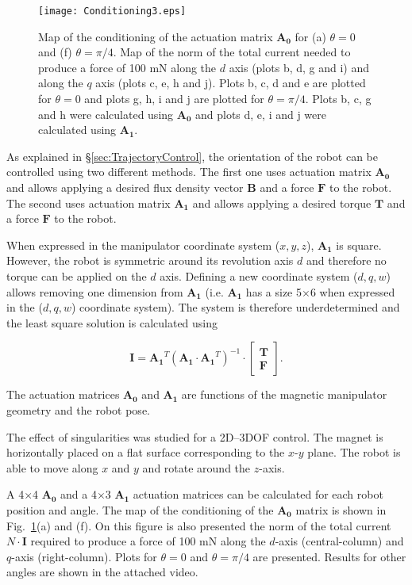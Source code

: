 \begin{figure}
	\texttt{[image: Conditioning3.eps]}
	\caption{Map of the conditioning of the actuation matrix $\mathbf{A_0}$ for (a) $\theta=0$ and (f) $\theta=\pi/4$. 
	Map of the norm of the total current needed to produce a force of 100 mN along the $d$ axis (plots b, d, g and i) and along the $q$ axis (plots c, e, h and j). 
	Plots b, c, d and e are plotted for $\theta=0$ and plots g, h, i and j are plotted for $\theta=\pi/4$.
	Plots b, c, g and h were calculated using $\mathbf{A_0}$ and plots d, e, i and j were calculated using $\mathbf{A_1}$. }
	\label{condition}
\end{figure}


As explained in \S\ref{sec:TrajectoryControl}, the orientation of the robot can be controlled using two different methods. 
 The first one uses actuation matrix $\mathbf{A_0}$ and allows applying a desired flux density vector $\mathbf{B}$ and a force $\mathbf{F}$ to the robot. 
 The second uses actuation matrix $\mathbf{A_1}$ and allows applying a desired torque $\mathbf{T}$ and a force $\mathbf{F}$ to the robot.

When expressed in the manipulator coordinate system ($x,y,z$), $\mathbf{A_1}$ is square. However, the robot is symmetric around its revolution axis $d$ and therefore no torque can be applied on the $d$ axis. Defining a new coordinate system ($d,q,w$) allows removing one dimension from $\mathbf{A_1}$ (i.e. $\mathbf{A_1}$ has a size 5$\times$6 when expressed in the ($d,q,w$) coordinate system). The system is therefore underdetermined and the least square solution is calculated using 
 
\begin{equation}
\label{LS}
\mathbf{I}=\mathbf{A_1}^{T}\left ( \mathbf{A_1} \cdot \mathbf{A_1}^{T} \right )^{-1}\cdot \begin{bmatrix}
\mathbf{T}
\\ 
\mathbf{F}
\end{bmatrix}.
\end{equation}

The actuation matrices $\mathbf{A_0}$ and $\mathbf{A_1}$ are functions of the magnetic manipulator geometry and the robot pose. 

The effect of singularities was studied for a 2D--3DOF control. The magnet is horizontally placed on a flat surface corresponding to the $x$-$y$ plane. The robot is able to move along $x$ and $y$ and rotate around the $z$-axis.

A 4$\times$4 $\mathbf{A_0}$ and a 4$\times$3 $\mathbf{A_1}$ actuation matrices can be calculated for each robot position and angle. The map of the conditioning of the $\mathbf{A_0}$ matrix is shown in Fig.~\ref{condition}(a) and (f). On this figure is also presented the norm of the total current $N \cdot \mathbf{I}$ required to produce a force of 100 mN along the $d$-axis (central-column) and $q$-axis (right-column). Plots for $\theta=0$ and $\theta=\pi/4$ are presented. Results for other angles are shown in the attached video.  

